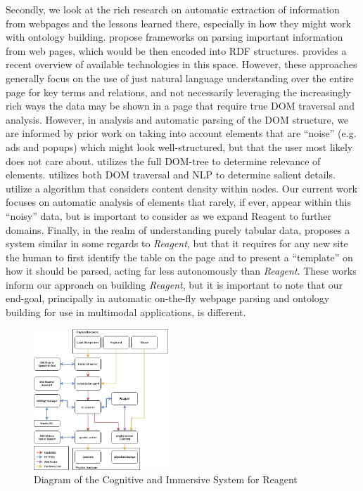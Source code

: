 Secondly, we look at the rich research on automatic extraction of
information from webpages and the lessons learned there, especially in how
they might work with ontology building. \cite{cimiano2004,storey2005} propose frameworks on parsing
important information from web pages, which would be then encoded into RDF structures.
\cite{gangemi2013} provides a recent
overview of available technologies in this space.
However, these approaches generally focus on the use of just natural language understanding over
the entire page for key terms and relations, and not necessarily leveraging the increasingly
rich ways the data may be shown in a page that require true DOM traversal and analysis. However,
in analysis and automatic parsing of the DOM structure, we are informed by prior work on taking
into account elements that are ``noise'' (e.g. ads and popups) which might look well-structured,
but that the user most likely does not care about. \cite{gupta2003}
utilizes the full DOM-tree to determine relevance of elements. \cite{joshi2009} utilizes both
DOM traversal and NLP to determine salient details. \cite{sun2011} utilize a algorithm that considers
content density within nodes. Our current work focuses on automatic analysis of elements that
rarely, if ever, appear within this ``noisy'' data, but is important to consider as we expand Reagent to further domains. Finally, in the realm of understanding purely
tabular data, \cite{hackinger_datagorri:_2018} proposes a system similar in some regards to
\textit{Reagent}, but that it requires for any new site the human to first identify the table on the
page and to present a ``template'' on how it should be parsed, acting far less autonomously than
\textit{Reagent}. These works inform our approach
on building \textit{Reagent}, but it is important to note that our end-goal, principally in
automatic on-the-fly webpage parsing and ontology building for use in multimodal applications, is different.

\begin{figure}
    \centering
    \includegraphics[width=0.45\textwidth]{chapters/03_reagent/figures/cir_diagram}
    \caption{Diagram of the Cognitive and Immersive System for Reagent}
    \label{fig:cais}
\end{figure}